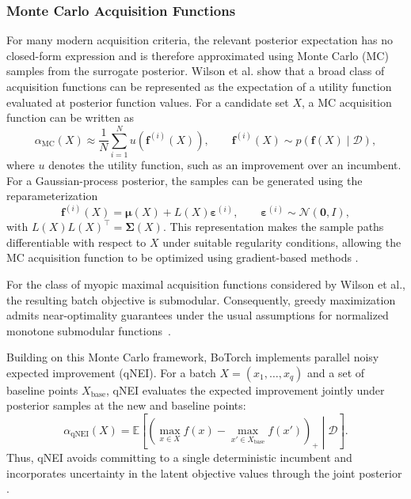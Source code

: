 \documentclass[12pt,a4paper]{report}
\begin{document}
        \subsubsection{Monte Carlo Acquisition Functions}
        For many modern acquisition criteria, the relevant posterior expectation has no closed-form expression and is therefore approximated using Monte Carlo (MC) samples from the surrogate posterior. Wilson et al. \cite{wilson2018maximizing} show that a broad class of acquisition functions can be represented as the expectation of a utility function evaluated at posterior function values. For a candidate set $X$, a MC acquisition function can be written as
        \[
        \alpha_{\mathrm{MC}}(X)
        \approx
        \frac{1}{N}\sum_{i=1}^{N}
        u\!\left(\mathbf f^{(i)}(X)\right),
        \qquad
        \mathbf f^{(i)}(X)
        \sim
        p\!\left(\mathbf f(X)\mid\mathcal{D}\right),
        \]
        where $u$ denotes the utility function, such as an improvement over an
        incumbent. For a Gaussian-process posterior, the samples can be generated
        using the reparameterization
        \[
        \mathbf f^{(i)}(X)
        =
        \boldsymbol{\mu}(X)
        +
        L(X)\boldsymbol{\varepsilon}^{(i)},
        \qquad
        \boldsymbol{\varepsilon}^{(i)}\sim\mathcal{N}(\mathbf{0},I),
        \]
        with $L(X)L(X)^\top=\boldsymbol{\Sigma}(X)$. This representation makes the sample paths differentiable with respect to $X$ under suitable regularity conditions, allowing the MC acquisition function to be optimized using gradient-based methods \cite{wilson2018maximizing,balandat2019botorch}.

        For the class of myopic maximal acquisition functions considered by Wilson et al., the resulting batch objective is submodular. Consequently, greedy maximization admits near-optimality guarantees under the usual assumptions for normalized monotone submodular functions~\cite{wilson2018maximizing}.

        Building on this Monte Carlo framework, BoTorch implements parallel noisy expected improvement (qNEI). For a batch $X=(x_1,\ldots,x_q)$ and a set of baseline points $X_{\mathrm{base}}$, qNEI evaluates the expected improvement jointly under posterior samples at the new and baseline points:
        \[
        \alpha_{\mathrm{qNEI}}(X)
        =
        \mathbb{E}\left[
        \left(
        \max_{x\in X} f(x)
        -
        \max_{x'\in X_{\mathrm{base}}}f(x')
        \right)_+
        \middle|\mathcal{D}
        \right].
        \]
        Thus, qNEI avoids committing to a single deterministic incumbent and
        incorporates uncertainty in the latent objective values through the joint
        posterior \cite{balandat2019botorch}.
\end{document}
